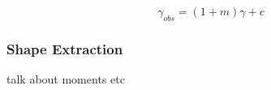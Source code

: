 \begin{equation}
    \gamma_{obs} = (1+m) \gamma + c
     \label{eq:shearobs}
\end{equation}




\subsubsection{Shape Extraction}
talk about moments etc



